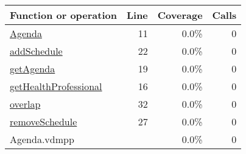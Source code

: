 \begin{longtable}{|l|r|r|r|}
\hline
Function or operation & Line & Coverage & Calls \\
\hline
\hline
\hyperref[Agenda:11]{Agenda} & 11&0.0\% & 0 \\
\hline
\hyperref[addSchedule:22]{addSchedule} & 22&0.0\% & 0 \\
\hline
\hyperref[getAgenda:19]{getAgenda} & 19&0.0\% & 0 \\
\hline
\hyperref[getHealthProfessional:16]{getHealthProfessional} & 16&0.0\% & 0 \\
\hline
\hyperref[overlap:32]{overlap} & 32&0.0\% & 0 \\
\hline
\hyperref[removeSchedule:27]{removeSchedule} & 27&0.0\% & 0 \\
\hline
\hline
Agenda.vdmpp & & 0.0\% & 0 \\
\hline
\end{longtable}

